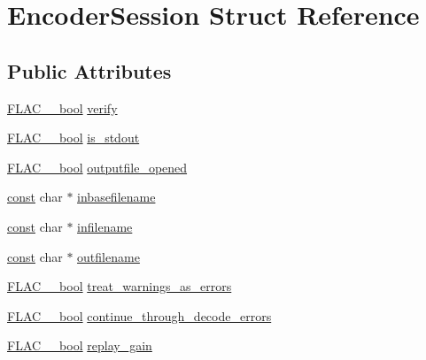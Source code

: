 \hypertarget{struct_encoder_session}{}\section{Encoder\+Session Struct Reference}
\label{struct_encoder_session}
\subsection*{Public Attributes}
\begin{DoxyCompactItemize}
\item 
\hyperlink{ordinals_8h_a95103469f1cbd78b8cf250194985b34e}{F\+L\+A\+C\+\_\+\+\_\+bool} \hyperlink{struct_encoder_session_a127818d0d50f1d2c12fb6bed15c9eded}{verify}
\item 
\hyperlink{ordinals_8h_a95103469f1cbd78b8cf250194985b34e}{F\+L\+A\+C\+\_\+\+\_\+bool} \hyperlink{struct_encoder_session_a277e1f653dd103fd863cf6abf1762d80}{is\+\_\+stdout}
\item 
\hyperlink{ordinals_8h_a95103469f1cbd78b8cf250194985b34e}{F\+L\+A\+C\+\_\+\+\_\+bool} \hyperlink{struct_encoder_session_a7c43a03b8e04d7d53d536d7d1f5fa62d}{outputfile\+\_\+opened}
\item 
\hyperlink{getopt1_8c_a2c212835823e3c54a8ab6d95c652660e}{const} char $\ast$ \hyperlink{struct_encoder_session_ad051e4729bbdb184bdffe798630fcfb3}{inbasefilename}
\item 
\hyperlink{getopt1_8c_a2c212835823e3c54a8ab6d95c652660e}{const} char $\ast$ \hyperlink{struct_encoder_session_ac7fa7d425ba62da933034c83d706bfc2}{infilename}
\item 
\hyperlink{getopt1_8c_a2c212835823e3c54a8ab6d95c652660e}{const} char $\ast$ \hyperlink{struct_encoder_session_a96753d59c83c0849e6d2a89b2041aea7}{outfilename}
\item 
\hyperlink{ordinals_8h_a95103469f1cbd78b8cf250194985b34e}{F\+L\+A\+C\+\_\+\+\_\+bool} \hyperlink{struct_encoder_session_ace0c8d11735675f91661df55a751d985}{treat\+\_\+warnings\+\_\+as\+\_\+errors}
\item 
\hyperlink{ordinals_8h_a95103469f1cbd78b8cf250194985b34e}{F\+L\+A\+C\+\_\+\+\_\+bool} \hyperlink{struct_encoder_session_a7d8744a6e81388bbd90e3610487ef9d6}{continue\+\_\+through\+\_\+decode\+\_\+errors}
\item 
\hyperlink{ordinals_8h_a95103469f1cbd78b8cf250194985b34e}{F\+L\+A\+C\+\_\+\+\_\+bool} \hyperlink{struct_encoder_session_adb426b9bf02b8abf46c43217bd4db853}{replay\+\_\+gain}
\item 

\end{DoxyCompactItemize}

